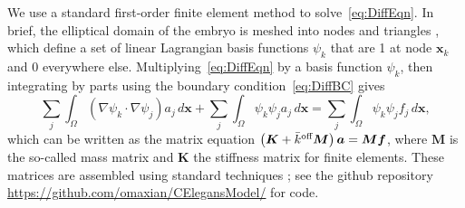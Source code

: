 \documentclass[11pt]{article}
\newcommand{\V}[1]{\boldsymbol{#1}}                 %
\newcommand{\M}[1]{\boldsymbol{#1}}
\begin{document}
\begin{appendix}
We use a standard first-order finite element method to solve\ \eqref{eq:DiffEqn}. In brief, the elliptical domain of the embryo is meshed into nodes and triangles \citep{persson2004simple}, which define a set of linear Lagrangian basis functions $\psi_k$ that are 1 at node $\V{x}_k$ and 0 everywhere else. Multiplying\ \eqref{eq:DiffEqn} by a basis function $\psi_k$, then integrating by parts using the boundary condition\ \eqref{eq:DiffBC} gives 
\begin{equation}
\sum_j \int_{\Omega} \left(\nabla \psi_k \cdot \nabla \psi_j\right) a_j \, d\V{x}+\sum_j \int_{\Omega} \psi_k \psi_j a_j \, d\V{x}= \sum_j \int_{\Omega} \psi_k \psi_j f_j \, d\V{x},
\end{equation}
which can be written as the matrix equation $\left(\M K + \koffb \M M \right) \V a = \M M \V f$, where $\M{M}$ is the so-called mass matrix and $\M{K}$ the stiffness matrix for finite elements. These matrices are assembled using standard techniques \citep[c.~7]{gockenbach2006understanding}; see the github repository \url{https://github.com/omaxian/CElegansModel/} for code.


\end{appendix}
\end{document}
